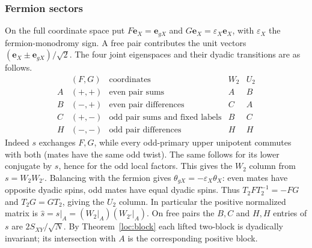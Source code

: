 \documentclass[11pt,a4paper]{article}
\numberwithin{equation}{section}
\begin{document}
\subsubsection{Fermion sectors}\label{loc:fermion-dictionary}
On the full coordinate space put $F\mathbf e_X=\mathbf e_{gX}$
and $G\mathbf e_X=\varepsilon_X\mathbf e_X$, with $\varepsilon_X$
the fermion-monodromy sign. A free pair contributes the unit vectors
$(\mathbf e_X\pm\mathbf e_{gX})/\sqrt2$. The four joint eigenspaces
and their dyadic transitions are as follows.
\[
\begin{array}{c|c|c|c|c}
     & (F,G) & \text{coordinates} & W_2 & U_2 \\ \hline
 A & (+,+)& \text{even pair sums} & A & B\\
 B & (-,+)& \text{even pair differences} & C & A\\
 C & (+,-)& \text{odd pair sums and fixed labels} & B & C\\
 H & (-,-)& \text{odd pair differences} & H & H
\end{array}
\]
Indeed $s$ exchanges $F,G$, while every odd-primary upper
unipotent commutes with both (mates have the same odd twist).
The same follows for its lower conjugate by $s$, hence for the
odd local factors. This gives the $W_2$ column from $s=W_2W_{2'}$.
Balancing with the fermion gives $\theta_{gX}=-\varepsilon_X\theta_X$:
even mates have opposite dyadic spins, odd mates have equal dyadic spins.
Thus $T_2FT_2^{-1}=-FG$ and $T_2G=GT_2$, giving the $U_2$ column. In particular the positive normalized matrix is
$\widehat s=s|_A=(W_2|_A)(W_{2'}|_A)$.
On free pairs the $B,C$ and $H,H$ entries of $s$ are
$2S_{XY}/\sqrt N$. By Theorem~\ref{loc:block} each lifted two-block
is dyadically invariant; its intersection with $A$ is the
corresponding positive block.
\end{document}
